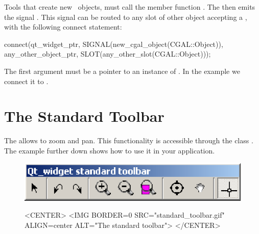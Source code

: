 Tools that create new \cgal\ objects, must call the member 
function . The
 then emits the signal
. This signal can be routed to
any slot of other object accepting a , with the
following connect statement:
\begin{ccExampleCode}
connect(qt_widget_ptr, SIGNAL(new_cgal_object(CGAL::Object)), 
        any_other_object_ptr, SLOT(any_other_slot(CGAL::Object)));
\end{ccExampleCode}

The first argument must be a pointer to an instance of .
In the example we connect it to .

\section{The Standard Toolbar}
\label{Qt_widget_standard_toolbar}

The  allows to zoom and pan. This functionality is 
accessible through the class . The 
example further down shows how to use it in your application.

\begin{figure}[h]
\begin{ccTexOnly}
\begin{center}
\includegraphics{standard_toolbar.eps} 
\end{center}
\end{ccTexOnly}
\begin{ccHtmlOnly}
<CENTER>
<IMG BORDER=0 SRC="standard_toolbar.gif"  ALIGN=center  ALT="The
standard toolbar">
</CENTER>
\end{ccHtmlOnly}
\end{figure}

